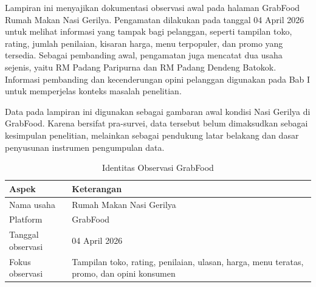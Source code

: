 \label{app:observasi-grabfood}

Lampiran ini menyajikan dokumentasi observasi awal pada halaman GrabFood Rumah Makan Nasi Gerilya. Pengamatan dilakukan pada tanggal 04 April 2026 untuk melihat informasi yang tampak bagi pelanggan, seperti tampilan toko, rating, jumlah penilaian, kisaran harga, menu terpopuler, dan promo yang tersedia. Sebagai pembanding awal, pengamatan juga mencatat dua usaha sejenis, yaitu RM Padang Paripurna dan RM Padang Dendeng Batokok. Informasi pembanding dan kecenderungan opini pelanggan digunakan pada Bab I untuk memperjelas konteks masalah penelitian.

Data pada lampiran ini digunakan sebagai gambaran awal kondisi Nasi Gerilya di GrabFood. Karena bersifat pra-survei, data tersebut belum dimaksudkan sebagai kesimpulan penelitian, melainkan sebagai pendukung latar belakang dan dasar penyusunan instrumen pengumpulan data.

\begin{table}[!htbp]
    \centering
    \caption{Identitas Observasi GrabFood}
    \label{tab:identitas_observasi_grabfood}
    \begin{tabularx}{\textwidth}{|J|Y|}
        \toprule
        \textbf{Aspek}    & \textbf{Keterangan}                                                           \\ \hline
        \midrule
        Nama usaha        & Rumah Makan Nasi Gerilya                                                      \\ \hline
        Platform          & GrabFood                                                                      \\ \hline
        Tanggal observasi & 04 April 2026                                                                 \\ \hline
        Fokus observasi   & Tampilan toko, rating, penilaian, ulasan, harga, menu teratas, promo, dan opini konsumen \\ \hline
        \bottomrule
    \end{tabularx}
\end{table}

